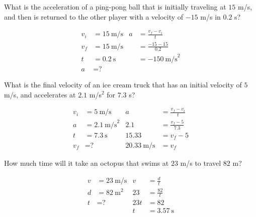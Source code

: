 \documentclass[10pt]{exam}
\begin{document}
\begin{questions}
  \question
    What is the acceleration of a ping-pong ball that is initially traveling at $15$ m/s, and then is returned to the other player with a velocity of $-15$ m/s in $0.2$ s?

    \begin{solution}[\stretch{1}]
      \vspace{-1.5em}
      \begin{align*}
        v_i & = 15~\text{m/s} &
                            a &= \frac{v_f-v_i}{t} \\
        v_f & = 15~\text{m/s} &
                            &= \frac{-15-15}{0.2} \\
        t   & = 0.2~\text{s} &
                            &= -150~\text{m/s}^2 \\
        a   & = \text{?} 
      \end{align*}
      \vspace{-1.5em}
    \end{solution}
  
  \question
    What is the final velocity of an ice cream truck that has an initial velocity of $5$ m/s, and accelerates at $2.1$ m/s$^2$ for $7.3$ s?

    \begin{solution}[\stretch{1}]
      \vspace{-1.5em}
      \begin{align*}
        v_i & = 5~\text{m/s} &
                            a    &= \frac{v_f-v_i}{t} \\
        a & = 2.1~\text{m/s}^2 &
                            2.1  &= \frac{v_f-5}{7.3} \\
        t   & = 7.3~\text{s} &
                           15.33 &= v_f-5 \\
        v_f   & = \text{?} &
                           20.33~\text{m/s} &= v_f 
      \end{align*}
      \vspace{-1.5em}
    \end{solution}

  \question
    How much time will it take an octopus that swims at $23$ m/s to travel $82$ m?
    
    \begin{solution}[\stretch{1}]
      \vspace{-1.5em}
      \begin{align*}
        v &= 23~\text{m/s} &      v &= \frac{d}{t}    \\
        d &= 82~\text{m}^2 &     23 &= \frac{82}{t}   \\
        t &= \text{?}      &    23t &= 82             \\
          &                &      t &= 3.57~\text{s}
      \end{align*}
      \vspace{-1.5em}
    \end{solution}


\end{questions}
\end{document}

